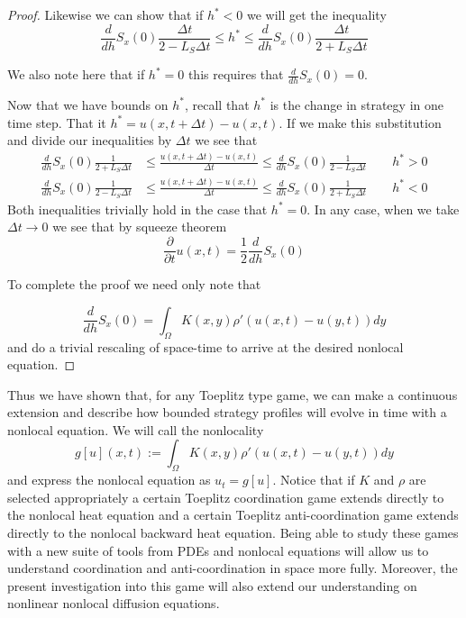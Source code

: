 \documentclass[aps,
preprint,
groupedaddress,
showkeys,
amsmath]{revtex4-2}
\begin{document}
\begin{proof}
        Likewise we can show that if $h^*<0$ we will get the inequality 
        \begin{equation*}
            \frac{d}{dh}S_x(0)\frac{\Delta t}{2-L_S\Delta t}\leq h^*\leq \frac{d}{dh}S_x(0)\frac{\Delta t}{2+L_S\Delta t}
        \end{equation*}

        We also note here that if $h^*=0$ this requires that $\frac{d}{dh}S_x(0)=0$. 

        Now that we have bounds on $h^*$, recall that $h^*$ is the change in strategy in one time step. That it $h^*=u(x,t+\Delta t)-u(x,t)$. If we make this substitution and divide our inequalities by $\Delta t$ we see that 
        \begin{equation*}
            \begin{split}
                \frac{d}{dh}S_x(0)\frac{1}{2+L_S\Delta t}&\leq \frac{u(x,t+\Delta t)-u(x,t)}{\Delta t}\leq\frac{d}{dh}S_x(0)\frac{1}{2-L_S\Delta t}\quad \quad h^*>0\\
                \frac{d}{dh}S_x(0)\frac{1}{2-L_S\Delta t}&\leq \frac{u(x,t+\Delta t)-u(x,t)}{\Delta t}\leq\frac{d}{dh}S_x(0)\frac{1}{2+L_S\Delta t}\quad \quad h^*<0
            \end{split}
        \end{equation*}
        Both inequalities trivially hold in the case that $h^*=0$. In any case, when we take $\Delta t\to 0$ we see that by squeeze theorem 
        \begin{equation*}
            \frac{\partial}{\partial t}u(x,t)=\frac{1}{2}\frac{d}{dh}S_x(0)
        \end{equation*}

        To complete the proof we need only note that 
        
       \[\frac{d}{dh}S_x(0)=\int_\Omega K(x,y)\rho'(u(x,t)-u(y,t))dy\] and do a trivial rescaling of space-time to arrive at the desired nonlocal equation.
        \end{proof}

        Thus we have shown that, for any Toeplitz type game, we can make a continuous extension and describe how bounded strategy profiles will evolve in time with a nonlocal equation. We will call the nonlocality 
        \begin{equation}\label{nonlocality}
            g[u](x,t):=\int_\Omega K(x,y)\rho'(u(x,t)-u(y,t))dy
        \end{equation}
        and express the nonlocal equation as $u_t=g[u]$. Notice that if $K$ and $\rho$ are selected appropriately a certain Toeplitz coordination game extends directly to the nonlocal heat equation \cite{NonlocalDiffusionProblems,GOMEZ2017} and a certain Toeplitz anti-coordination game extends directly to the nonlocal backward heat equation. Being able to study these games with a new suite of tools from PDEs and nonlocal equations will allow us to understand coordination and anti-coordination in space more fully. Moreover, the present investigation into this game will also extend our understanding on nonlinear nonlocal diffusion equations.  
\end{document}
